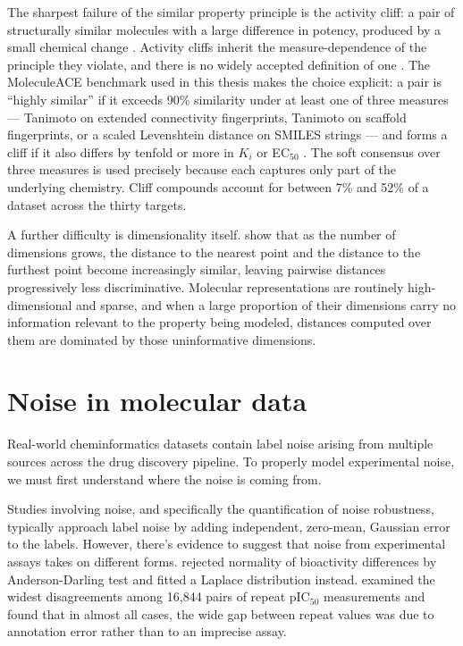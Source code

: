 The sharpest failure of the similar property principle is the activity cliff: a pair of structurally similar molecules with a large difference in potency, produced by a small
chemical change \citep{Maggiora2006, Stumpfe2012}. Activity cliffs inherit the measure-dependence of the principle they violate, and there is no widely accepted definition of one
\citep{vanTilborg2022}. The MoleculeACE benchmark used in this thesis makes the choice explicit: a pair is ``highly similar'' if it exceeds 90\% similarity under at least one of
three measures --- Tanimoto on extended connectivity fingerprints, Tanimoto on scaffold fingerprints, or a scaled Levenshtein distance on SMILES strings --- and forms a cliff if
it also differs by tenfold or more in $K_i$ or EC$_{50}$ \citep{vanTilborg2022}. The soft consensus over three measures is used precisely because each captures only part of the
underlying chemistry. Cliff compounds account for between 7\% and 52\% of a dataset across the thirty targets.

A further difficulty is dimensionality itself. \citet{Aggarwal2001} show that as the number of dimensions grows, the distance to the nearest point and the distance to the furthest
point become increasingly similar, leaving pairwise distances progressively less discriminative. Molecular representations are routinely high-dimensional and sparse, and when a
large proportion of their dimensions carry no information relevant to the property being modeled, distances computed over them are dominated by those uninformative dimensions.



\section{Noise in molecular data}

Real-world cheminformatics datasets contain label noise arising from multiple sources across the drug discovery pipeline. To properly model experimental noise, we must first understand where the noise is coming from.

Studies involving noise, and specifically the quantification of noise robustness, typically approach label noise by adding independent, zero-mean, Gaussian error to the labels. However, there's evidence to suggest that noise from experimental assays takes on different forms. \citet{Kruger2012} rejected normality of bioactivity differences by Anderson-Darling test and fitted a Laplace distribution instead. \citet{Kalliokoski2013} examined the widest disagreements among 16,844 pairs of repeat pIC$_{50}$ measurements and found that in almost all cases, the wide gap between repeat values was due to annotation error rather than to an imprecise assay.

